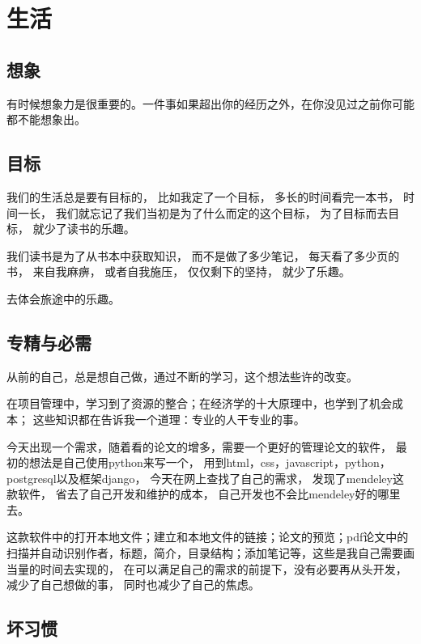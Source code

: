 
\chapter{生活}

\section{想象}

有时候想象力是很重要的。一件事如果超出你的经历之外，在你没见过之前你可能都不能想象出。

\section{目标}

我们的生活总是要有目标的，
比如我定了一个目标，
多长的时间看完一本书，
时间一长，
我们就忘记了我们当初是为了什么而定的这个目标，
为了目标而去目标，
就少了读书的乐趣。



我们读书是为了从书本中获取知识，
而不是做了多少笔记，
每天看了多少页的书，
来自我麻痹，
或者自我施压，
仅仅剩下的坚持，
就少了乐趣。


去体会旅途中的乐趣。


\section{专精与必需}

从前的自己，总是想自己做，通过不断的学习，这个想法些许的改变。

在项目管理中，学习到了资源的整合；在经济学的十大原理中，也学到了机会成本；
这些知识都在告诉我一个道理：专业的人干专业的事。

今天出现一个需求，随着看的论文的增多，需要一个更好的管理论文的软件，
最初的想法是自己使用python来写一个，
用到html，css，javascript，python，postgresql以及框架django，
今天在网上查找了自己的需求，
发现了mendeley这款软件，
省去了自己开发和维护的成本，
自己开发也不会比mendeley好的哪里去。


这款软件中的打开本地文件；建立和本地文件的链接；论文的预览；pdf论文中的扫描并自动识别作者，标题，简介，目录结构；添加笔记等，这些是我自己需要画当量的时间去实现的，
在可以满足自己的需求的前提下，没有必要再从头开发，
减少了自己想做的事，
同时也减少了自己的焦虑。

\section{坏习惯}

